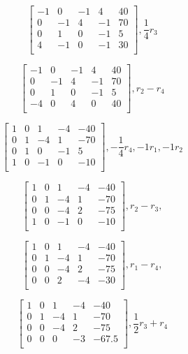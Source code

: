 \documentclass{amsart}
\begin{document}
\begin{equation}
\begin{bmatrix} 
-1&0&-1&4&40\\
0&-1&4&-1&70\\
0&1&0&-1&5\\
4&-1&0&-1&30\\
\end{bmatrix}, \frac{1}{4}r_3
\end{equation}

\begin{equation}
\begin{bmatrix} 
-1&0&-1&4&40\\
0&-1&4&-1&70\\
0&1&0&-1&5\\
-4&0&4&0&40\\
\end{bmatrix}, r_2-r_4
\end{equation}

\begin{equation}
\begin{bmatrix} 
1&0&1&-4&-40\\
0&1&-4&1&-70\\
0&1&0&-1&5\\
1&0&-1&0&-10\\
\end{bmatrix}, -\frac{1}{4}r_4, -1r_1,-1r_2
\end{equation}

\begin{equation}
\begin{bmatrix} 
1&0&1&-4&-40\\
0&1&-4&1&-70\\
0&0&-4&2&-75\\
1&0&-1&0&-10\\
\end{bmatrix}, r_2-r_3,
\end{equation}

\begin{equation}
\begin{bmatrix} 
1&0&1&-4&-40\\
0&1&-4&1&-70\\
0&0&-4&2&-75\\
0&0&2&-4&-30\\
\end{bmatrix}, r_1-r_4,
\end{equation}

\begin{equation}
\begin{bmatrix} 
1&0&1&-4&-40\\
0&1&-4&1&-70\\
0&0&-4&2&-75\\
0&0&0&-3&-67.5\\
\end{bmatrix},  \frac{1}{2}r_3+r_4
\end{equation}
\end{document}

